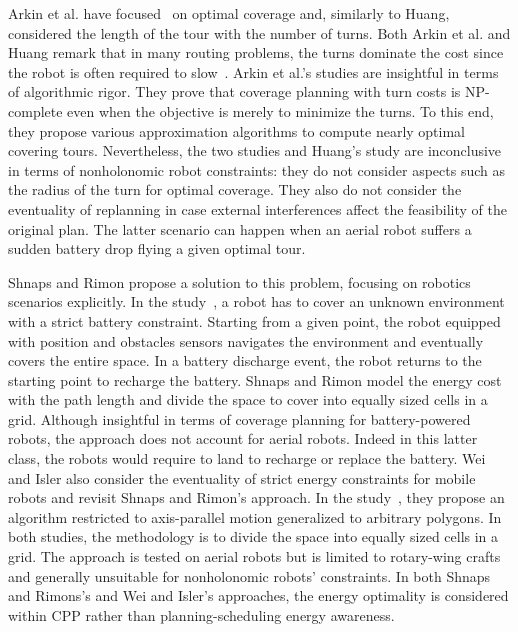 Arkin et al. have focused~\citep{arkin2001optimal,arkin2005optimal} on optimal coverage and, similarly to Huang, considered the length of the tour with the number of turns. Both Arkin et al. and Huang remark that in many routing problems, the turns dominate the cost since the robot is often required to slow~\citep{arkin2001optimal}. Arkin et al.'s studies are insightful in terms of algorithmic rigor. They prove that coverage planning with turn costs is NP-complete even when the objective is merely to minimize the turns. To this end, they propose various approximation algorithms to compute nearly optimal covering tours. Nevertheless, the two studies and Huang's study are inconclusive in terms of nonholonomic robot constraints: they do not consider aspects such as the radius of the turn for optimal coverage. They also do not consider the eventuality of replanning in case external interferences affect the feasibility of the original plan. The latter scenario can happen when an aerial robot suffers a sudden battery drop flying a given optimal tour.

Shnaps and Rimon propose a solution to this problem, focusing on robotics scenarios explicitly. In the study~\citep{shnaps2016online}, a robot has to cover an unknown environment with a strict battery constraint. Starting from a given point, the robot equipped with position and obstacles sensors navigates the environment and eventually covers the entire space. In a battery discharge event, the robot returns to the starting point to recharge the battery. Shnaps and Rimon model the energy cost with the path length and divide the space to cover into equally sized cells in a grid. Although insightful in terms of coverage planning for battery-powered robots, the approach does not account for aerial robots. Indeed in this latter class, the robots would require to land to recharge or replace the battery. Wei and Isler also consider the eventuality of strict energy constraints for mobile robots and revisit Shnaps and Rimon's approach. In the study~\citep{wei2018coverage}, they propose an algorithm restricted to axis-parallel motion generalized to arbitrary polygons. In both studies, the methodology is to divide the space into equally sized cells in a grid. The approach is tested on aerial robots but is limited to rotary-wing crafts and generally unsuitable for nonholonomic robots' constraints. In both Shnaps and Rimons's and Wei and Isler's approaches, the energy optimality is considered within CPP rather than planning-scheduling energy awareness.


